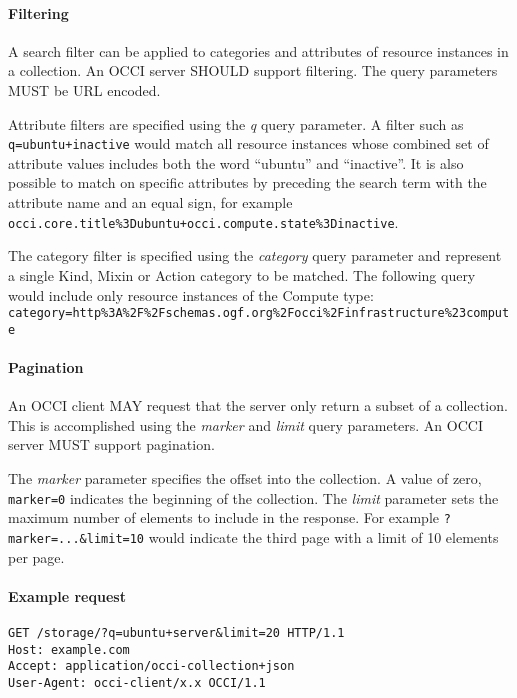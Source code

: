 \documentclass[10pt,a4paper]{article}
\begin{document}
\paragraph*{Filtering} A search filter can be applied to categories and attributes
of resource instances in a collection. An OCCI server SHOULD support filtering.
The query parameters MUST be URL encoded.

Attribute filters are specified using the {\em q} query parameter.  A filter such
as {\tt q=ubuntu+inactive} would match all resource instances whose combined
set of attribute values includes both the word ``ubuntu'' and ``inactive''. It
is also possible to match on specific attributes by preceding the search term
with the attribute name and an equal sign, for example {\tt
occi.core.title\%3Dubuntu+occi.compute.state\%3Dinactive}.

The category filter is specified using the {\em category} query parameter and
represent a single Kind, Mixin or Action category to be matched. The following
query would include only resource instances of the Compute type:
{\tt category=http\%3A\%2F\%2Fschemas.ogf.org\%2Focci\%2Finfrastructure\%23compute}

\paragraph*{Pagination}
\label{sec:collection:pagination}
An OCCI client MAY request that the server only return
a subset of a collection. This is accomplished using the {\em marker} and
{\em limit} query parameters.  An OCCI server MUST support pagination.

The {\em marker} parameter specifies the offset into the collection. A value of
zero, {\tt marker=0} indicates the beginning of the collection.
%
The {\em limit} parameter sets the maximum number of elements to include in the
response. For example {\tt ?marker=...\&limit=10} would indicate the third page
with a limit of 10 elements per page.

\paragraph*{Example request}

\begin{verbatim}
GET /storage/?q=ubuntu+server&limit=20 HTTP/1.1
Host: example.com
Accept: application/occi-collection+json
User-Agent: occi-client/x.x OCCI/1.1
\end{verbatim}
\end{document}
